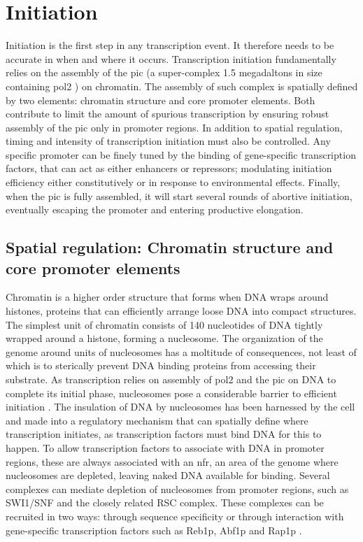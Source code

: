 \section{Initiation}

Initiation is the first step in any transcription event. 
It therefore needs to be accurate in when and where it occurs. 
Transcription initiation fundamentally relies on the assembly of the \gls{pic} (a super-complex 1.5 megadaltons in size  containing \gls{pol2} \cite{fazal:2015:realtime}) on chromatin.
The assembly of such complex is spatially defined by two elements: chromatin structure and core promoter elements.
Both contribute to limit the amount of spurious transcription by ensuring robust assembly of the \gls{pic} only in promoter regions.
In addition to spatial regulation, timing and intensity of transcription initiation must also be controlled.
Any specific promoter can be finely tuned by the binding of gene-specific transcription factors, that can act as either enhancers or repressors; modulating initiation efficiency either constitutively or in response to environmental effects. 
Finally, when the \gls{pic} is fully assembled, it will start several rounds of abortive initiation, eventually escaping the promoter and entering productive elongation.

\subsection{Spatial regulation: Chromatin structure and core promoter elements}

Chromatin is a higher order structure that forms when DNA wraps around histones, proteins that can efficiently arrange loose DNA into compact structures.
The simplest unit of chromatin consists of 140 nucleotides of DNA tightly wrapped around a histone, forming a nucleosome.
The organization of the genome around units of nucleosomes has a moltitude of consequences, not least of which is to sterically prevent DNA binding proteins from accessing their substrate. 
As transcription relies on assembly of \gls{pol2} and the \gls{pic} on DNA to complete its initial phase, nucleosomes pose a considerable barrier to efficient initiation \cite{field:2008:distinct} \cite{jiang:2009:compiled}.
The insulation of DNA by nucleosomes has been harnessed by the cell and made into a regulatory mechanism that can spatially define where transcription initiates, as transcription factors must bind DNA for this to happen. 
To allow transcription factors to associate with DNA in promoter regions, these are always associated with an \gls{nfr}, an area of the genome where nucleosomes are depleted, leaving naked DNA available for binding.
Several complexes can mediate depletion of nucleosomes from promoter regions, such as SWI1/SNF and the closely related RSC complex.
These complexes can be recruited in two ways: through sequence specificity or through interaction with gene-specific transcription factors such as Reb1p, Abf1p and Rap1p \citep{floer:2010:rscnucleosome, hartley:2009:mechanisms, spain:2014:rsc}.

